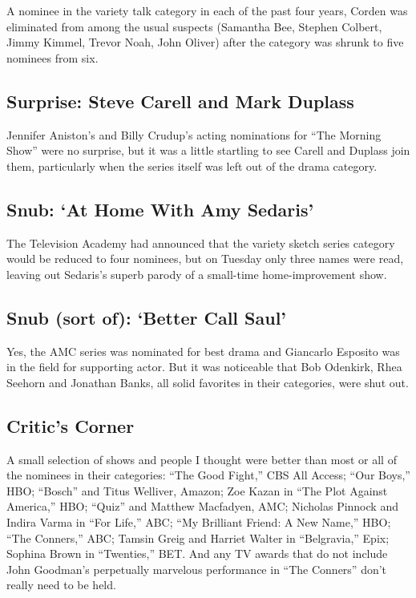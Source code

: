 A nominee in the variety talk category in each of the past four years,
Corden was eliminated from among the usual suspects (Samantha Bee,
Stephen Colbert, Jimmy Kimmel, Trevor Noah, John Oliver) after the
category was shrunk to five nominees from six.

\hypertarget{surprise-steve-carell-and-mark-duplass}{%
\subsection{Surprise: Steve Carell and Mark
Duplass}\label{surprise-steve-carell-and-mark-duplass}}

Jennifer Aniston's and Billy Crudup's acting nominations for ``The
Morning Show'' were no surprise, but it was a little startling to see
Carell and Duplass join them, particularly when the series itself was
left out of the drama category.

\hypertarget{snub-at-home-with-amy-sedaris}{%
\subsection{Snub: `At Home With Amy
Sedaris'}\label{snub-at-home-with-amy-sedaris}}

The Television Academy had announced that the variety sketch series
category would be reduced to four nominees, but on Tuesday only three
names were read, leaving out Sedaris's superb parody of a small-time
home-improvement show.

\hypertarget{snub-sort-of-better-call-saul}{%
\subsection{Snub (sort of): `Better Call
Saul'}\label{snub-sort-of-better-call-saul}}

Yes, the AMC series was nominated for best drama and Giancarlo Esposito
was in the field for supporting actor. But it was noticeable that Bob
Odenkirk, Rhea Seehorn and Jonathan Banks, all solid favorites in their
categories, were shut out.

\hypertarget{critics-corner}{%
\subsection{Critic's Corner}\label{critics-corner}}

A small selection of shows and people I thought were better than most or
all of the nominees in their categories: ``The Good Fight,'' CBS All
Access; ``Our Boys,'' HBO; ``Bosch'' and Titus Welliver, Amazon; Zoe
Kazan in ``The Plot Against America,'' HBO; ``Quiz'' and Matthew
Macfadyen, AMC; Nicholas Pinnock and Indira Varma in ``For Life,'' ABC;
``My Brilliant Friend: A New Name,'' HBO; ``The Conners,'' ABC; Tamsin
Greig and Harriet Walter in ``Belgravia,'' Epix; Sophina Brown in
``Twenties,'' BET. And any TV awards that do not include John Goodman's
perpetually marvelous performance in ``The Conners'' don't really need
to be held.

